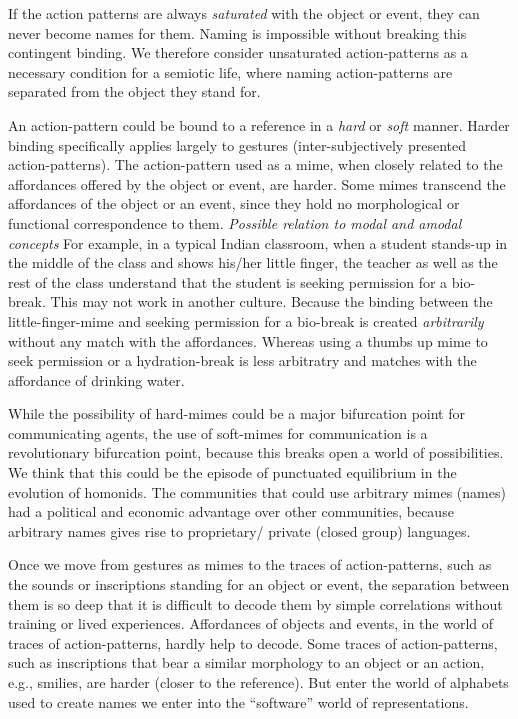 If the action patterns are always \textit{saturated} with the object or event, they can never become names for them. Naming is impossible without breaking this contingent binding. We therefore consider unsaturated action-patterns as a necessary condition for a semiotic life, where naming action-patterns are separated from the object they stand for. 

An action-pattern could be bound to a reference in a \textit{hard} or \textit{soft} manner. Harder binding specifically applies largely to gestures (inter-subjectively presented action-patterns). 
The action-pattern used as a mime, when closely related to the affordances offered by the object or event, are harder. 
Some mimes transcend the affordances of the object or an event, since they hold no morphological or functional correspondence to them. \emph{Possible relation to modal and amodal concepts} For example, in a typical Indian classroom, when a student stands-up in the middle of the class and shows his/her little finger, the teacher as well as the rest of the class understand that the student is seeking permission for a bio-break. This may not work in another culture. Because the binding between the little-finger-mime and seeking permission for a bio-break is created \textit{arbitrarily} without any match with the affordances. Whereas using a thumbs up mime to seek permission or a hydration-break is less arbitratry and matches with the affordance of drinking water. 

While the possibility of hard-mimes could be a major bifurcation point for communicating agents, the use of soft-mimes for communication is a revolutionary bifurcation point, because this breaks open a world of possibilities. 
We think that this could be the episode of punctuated equilibrium\cite{gould1977punctuated} in the evolution of homonids. The communities that could use arbitrary mimes (names) had a political and economic advantage over other communities, because arbitrary names gives rise to proprietary/ private (closed group) languages.\cite{corballis2014recursive}

Once we move from gestures as mimes to the traces of action-patterns, such as the sounds or inscriptions standing for an object or event, the separation between them is so deep that it is difficult to decode them by simple correlations without training or lived experiences. 
Affordances of objects and events, in the world of traces of action-patterns, hardly help to decode. Some traces of action-patterns, such as inscriptions that bear a similar morphology to an object or an action, e.g., smilies, are harder (closer to the reference). But enter the world of alphabets used to create names we enter into the ``software'' world of representations. 

